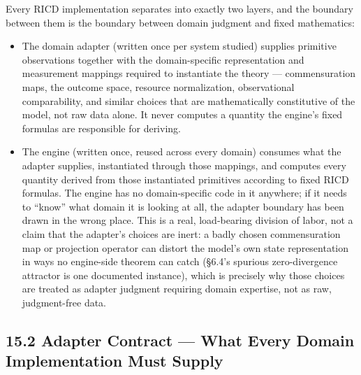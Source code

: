 \documentclass[
]{article}
\begin{document}
Every RICD implementation separates into exactly two layers, and the
boundary between them is the boundary between domain judgment and fixed
mathematics:

\begin{itemize}
\item
  The domain adapter (written once per system studied) supplies
  primitive observations together with the domain-specific
  representation and measurement mappings required to instantiate the
  theory --- commensuration maps, the outcome space, resource
  normalization, observational comparability, and similar choices that
  are mathematically constitutive of the model, not raw data alone. It
  never computes a quantity the engine's fixed formulas are responsible
  for deriving.
\item
  The engine (written once, reused across every domain) consumes what
  the adapter supplies, instantiated through those mappings, and
  computes every quantity derived from those instantiated primitives
  according to fixed RICD formulas. The engine has no domain-specific
  code in it anywhere; if it needs to ``know'' what domain it is looking
  at all, the adapter boundary has been drawn in the wrong place. This
  is a real, load-bearing division of labor, not a claim that the
  adapter's choices are inert: a badly chosen commensuration map or
  projection operator can distort the model's own state representation
  in ways no engine-side theorem can catch (§6.4's spurious
  zero-divergence attractor is one documented instance), which is
  precisely why those choices are treated as adapter judgment requiring
  domain expertise, not as raw, judgment-free data.
\end{itemize}

\hypertarget{adapter-contract-what-every-domain-implementation-must-supply}{%
\subsection{15.2 Adapter Contract --- What Every Domain Implementation
Must
Supply}\label{adapter-contract-what-every-domain-implementation-must-supply}}
\end{document}
